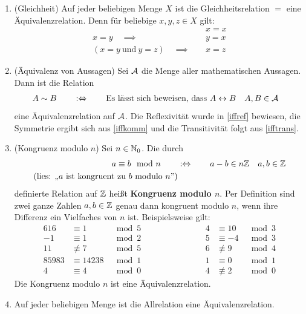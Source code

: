 \begin{bsp} \label{bsp:aequirel}  \quad
    \begin{enumerate}
        \item(Gleichheit) Auf jeder beliebigen Menge $X$ ist die Gleichheitsrelation $=$ eine Äquivalenzrelation. Denn für beliebige $x,y,z\in X$ gilt:
        \begin{align*}
            & x = x \\
            x=y\quad \implies\quad & y=x \\
            (x=y\ \text{und}\ y=z) \quad\implies\quad & x=z
        \end{align*}
        \item(Äquivalenz von Aussagen) Sei $\mathcal A$ die Menge aller mathematischen Aussagen. Dann ist die Relation
        \begin{align*}
            A\sim B \qquad&:\Leftrightarrow\qquad \text{Es lässt sich beweisen, dass $A\leftrightarrow B$} && A,B\in\mathcal A
        \end{align*}
        eine Äquivalenzrelation auf $\mathcal A$. Die Reflexivität wurde in \cref{iffref} bewiesen, die Symmetrie ergibt sich aus \cref{iffkomm} und die Transitivität folgt aus \cref{ifftrans}.
        \item(Kongruenz modulo $n$) Sei $n\in \mathbb N_0$. Die durch
        \begin{align*}
            a\equiv b\mod n \qquad& :\Leftrightarrow\qquad a-b\in n\mathbb Z && a,b\in \mathbb Z \\
            (\text{lies: „$a$ ist kongruent zu $b$ modulo $n$”})
        \end{align*}
        definierte Relation auf $\mathbb Z$ heißt \textbf{Kongruenz modulo $n$}. Per Definition sind zwei ganze Zahlen $a,b\in \mathbb Z$ genau dann kongruent modulo $n$, wenn ihre Differenz ein Vielfaches von $n$ ist. Beispielsweise gilt:
        \begin{alignat*}{6}
            16 &\equiv 1&\mod 5 \qquad&\qquad&\qquad  4 &\equiv 10 &\mod 3 \\
            -1&\equiv 1 &\mod 2 \qquad&\qquad&\qquad  5 &\equiv -4 &\mod 3 \\
            11 &\not\equiv 7 &\mod 5 \qquad&\qquad&\qquad 6 &\not\equiv 9 &\mod 4 \\
            85983 &\equiv 14238 &\mod 1 \qquad&\qquad&\qquad  1 &\equiv 0 &\mod 1 \\
            4 &\equiv 4 &\mod 0 \qquad&\qquad&\qquad  4 &\not \equiv 2 &\mod 0
        \end{alignat*}
        Die Kongruenz modulo $n$ ist eine Äquivalenzrelation.
        \item Auf jeder beliebigen Menge ist die Allrelation eine Äquivalenzrelation.
    \end{enumerate}
\end{bsp}


